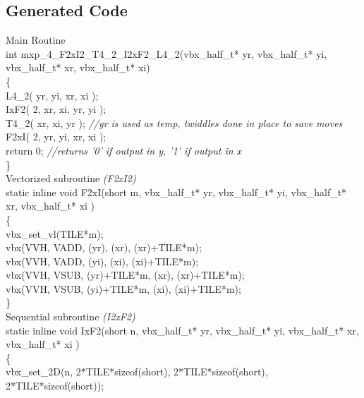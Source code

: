 \documentclass[11pt]{article}
\begin{document}
\subsection*{Generated Code}
Main Routine 
\noindent\makebox[\linewidth]{\rule{\textwidth}{1pt}} \\
\newline
int mxp\_4\_F2xI2\_T4\_2\_I2xF2\_L4\_2(vbx\_half\_t* yr, vbx\_half\_t* yi, vbx\_half\_t* xr, vbx\_half\_t* xi)\\
\{\\
	\indent	L4\_2( yr, yi, xr, xi );\\
	\indent	IxF2( 2, xr, xi, yr, yi );\\
	\indent	T4\_2( xr, xi, yr ); \emph{//yr is used as temp, twiddles done in place to save moves}\\
	\indent	F2xI( 2, yr, yi, xr, xi );\\ 
	\indent return 0; \emph{//returns '0' if output in y, '1' if output in x}\\
\}\\
\newline
Vectorized subroutine \emph{(F2xI2)}
\noindent\makebox[\linewidth]{\rule{\textwidth}{1pt}} \\
\newline
static inline void F2xI(short m, vbx\_half\_t* yr, vbx\_half\_t* yi, vbx\_half\_t* xr, vbx\_half\_t* xi )\\
\{\\
	\indent vbx\_set\_vl(TILE*m);\\
	\indent vbx(VVH, VADD, (yr),        (xr),        (xr)+TILE*m);\\
	\indent vbx(VVH, VADD, (yi),        (xi),        (xi)+TILE*m);\\
	\indent vbx(VVH, VSUB, (yr)+TILE*m,   (xr),        (xr)+TILE*m);\\
	\indent vbx(VVH, VSUB, (yi)+TILE*m,   (xi),        (xi)+TILE*m);\\
\}\\
\newline
Sequential subroutine \emph{(I2xF2)}
\noindent\makebox[\linewidth]{\rule{\textwidth}{1pt}} \\
\newline
static inline void IxF2(short n, vbx\_half\_t* yr, vbx\_half\_t* yi, vbx\_half\_t* xr, vbx\_half\_t* xi )\\
\{\\
	\indent vbx\_set\_2D(n, 2*TILE*sizeof(short), 2*TILE*sizeof(short), 2*TILE*sizeof(short));\\
\end{document}
